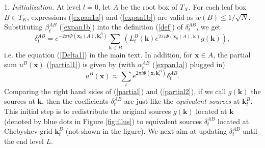 



1. {\it Initialization.} At level $l=0$, let $A$ be the root box of $T_X$. For each leaf box $B\in T_K$, expressions (\ref{expan1a}) and (\ref{expan1b}) are valid as $w(B)\leq 1/\sqrt{N}$. Substituting $\beta_t^{AB}$ (\ref{expan1b}) into the definition (\ref{def}) of $\delta_t^{AB}$, we get
\begin{equation} \label{delta1}
\delta_t^{AB}=e^{-2\pi i
  \Phi(\mathbf{x}_0(A),\mathbf{k}_t^B)}\sum_{\mathbf{k}\in B}\left(
  L_t^B(\mathbf{k}) e^{2\pi i \Phi(\mathbf{x}_0(A),\mathbf{k})}g(\mathbf{k}) \right),
\end{equation}
i.e. the equation (\ref{Delta1}) in the main text. In addition, for $\mathbf{x}\in A$, the partial sum $u^B(\mathbf{x})$ (\ref{partial1}) is given by (with $\alpha_t^{AB}$ (\ref{expan1a}) plugged in)
\begin{equation} \label{partial2}
u^{B}(\mathbf{x}) \approx
\sum_t e^{2\pi i
  \Phi(\mathbf{x},\mathbf{k}_t^B)}\delta_t^{AB}.
\end{equation}
Comparing the right hand sides of (\ref{partial}) and (\ref{partial2}), if we call $g(\mathbf{k})$ the sources at $\mathbf{k}$, then the coefficients $\delta_t^{AB}$ are just like the {\it equivalent sources} at $\mathbf{k}_t^B$. This initial step is to redistribute the original sources $g(\mathbf{k})$ located at $\mathbf{k}$ (denoted by blue dots in Figure \ref{fig:illus}) to equivalent sources $\delta^{AB}_t$ located at Chebyshev grid $\mathbf{k}_t^B$ (not shown in the figure). We next aim at updating $\delta_t^{AB}$ until the end level $L$.

